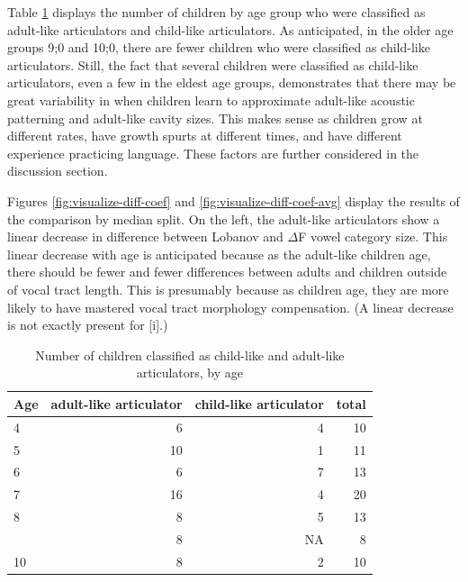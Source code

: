 \documentclass[
]{article}
\begin{document}
Table \ref{tab:type-of-articulator-tbl} displays the number of children by age group who were classified as adult-like articulators and child-like articulators. As anticipated, in the older age groups 9;0 and 10;0, there are fewer children who were classified as child-like articulators. Still, the fact that several children were classified as child-like articulators, even a few in the eldest age groups, demonstrates that there may be great variability in when children learn to approximate adult-like acoustic patterning and adult-like cavity sizes. This makes sense as children grow at different rates, have growth spurts at different times, and have different experience practicing language. These factors are further considered in the discussion section.

Figures \ref{fig:visualize-diff-coef} and \ref{fig:visualize-diff-coef-avg} display the results of the comparison by median split. On the left, the adult-like articulators show a linear decrease in difference between Lobanov and \(\Delta\)F vowel category size. This linear decrease with age is anticipated because as the adult-like children age, there should be fewer and fewer differences between adults and children outside of vocal tract length. This is presumably because as children age, they are more likely to have mastered vocal tract morphology compensation. (A linear decrease is not exactly present for {[}i{]}.)

\begin{table}[!h]

\caption{\label{tab:type-of-articulator-tbl}Number of children classified as child-like and adult-like articulators, by age}
\centering
\begin{tabular}[t]{lrrr}
\toprule
Age & adult-like articulator & child-like articulator & total\\
\midrule
4 & 6 & 4 & 10\\
5 & 10 & 1 & 11\\
6 & 6 & 7 & 13\\
7 & 16 & 4 & 20\\
8 & 8 & 5 & 13\\
\addlinespace
9 & 8 & NA & 8\\
10 & 8 & 2 & 10\\
\bottomrule
\end{tabular}
\end{table}
\end{document}
